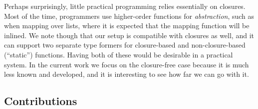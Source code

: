 \documentclass[acmsmall,screen,review,anonymous]{acmart}
\theoremstyle{remark}
\begin{document}
Perhaps surprisingly, little practical programming relies essentially on
closures. Most of the time, programmers use higher-order functions for
\emph{abstraction}, such as when mapping over lists, where it is expected that
the mapping function will be inlined. We note though that our setup is
compatible with closures as well, and it can support two separate type formers
for closure-based and non-closure-based (``static'') functions. Having both of
these would be desirable in a practical system. In the current work we focus on
the closure-free case because it is much less known and developed, and it is
interesting to see how far we can go with it.




\subsection{Contributions}
\end{document}
